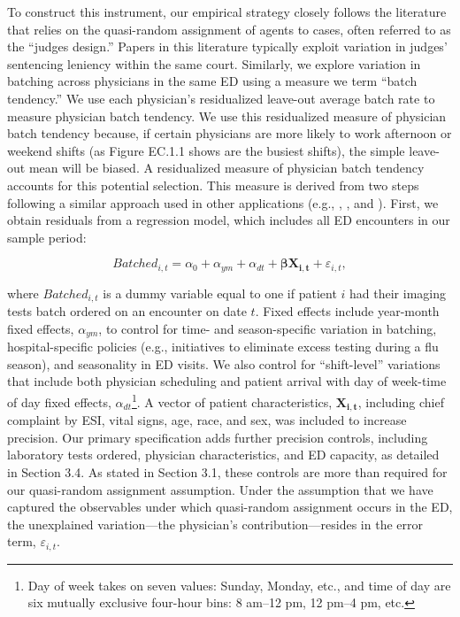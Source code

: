 \documentclass[,,blindrev]{informs}
\begin{document}
To construct this instrument, our empirical strategy closely follows the
literature that relies on the quasi-random assignment of agents to
cases, often referred to as the ``judges design.'' Papers in this
literature typically exploit variation in judges' sentencing leniency
within the same court. Similarly, we explore variation in batching
across physicians in the same ED using a measure we term ``batch
tendency.'' We use each physician's residualized leave-out average batch
rate to measure physician batch tendency. We use this residualized
measure of physician batch tendency because, if certain physicians are
more likely to work afternoon or weekend shifts (as Figure EC.1.1 shows
are the busiest shifts), the simple leave-out mean will be biased. A
residualized measure of physician batch tendency accounts for this
potential selection. This measure is derived from two steps following a
similar approach used in other applications (e.g.,
\citet{doyle2015measuring}, \citet{dobbie2018effects}, and
\citet{eichmeyer2022pathways}). First, we obtain residuals from a
regression model, which includes all ED encounters in our sample period:

\begin{equation}
Batched_{i,t} = \alpha_0 + \alpha_{ym} + \alpha_{dt} + \mathbf{\beta X_{i,t}} + \varepsilon_{i,t},
\end{equation}

where \(Batched_{i,t}\) is a dummy variable equal to one if patient
\(i\) had their imaging tests batch ordered on an encounter on date
\(t\). Fixed effects include year-month fixed effects, \(\alpha_{ym}\),
to control for time- and season-specific variation in batching,
hospital-specific policies (e.g., initiatives to eliminate excess
testing during a flu season), and seasonality in ED visits. We also
control for ``shift-level'' variations that include both physician
scheduling and patient arrival with day of week-time of day fixed
effects,
\(\alpha_{dt}\)\footnote{Day of week takes on seven values: Sunday, Monday, etc., and time of day are six mutually exclusive four-hour bins: 8 am–12 pm, 12 pm–4 pm, etc.}.
A vector of patient characteristics, \(\mathbf{X_{i,t}}\), including
chief complaint by ESI, vital signs, age, race, and sex, was included to
increase precision. Our primary specification adds further precision
controls, including laboratory tests ordered, physician characteristics,
and ED capacity, as detailed in Section 3.4. As stated in Section 3.1,
these controls are more than required for our quasi-random assignment
assumption. Under the assumption that we have captured the observables
under which quasi-random assignment occurs in the ED, the unexplained
variation---the physician's contribution---resides in the error term,
\(\varepsilon_{i,t}\).
\end{document}
